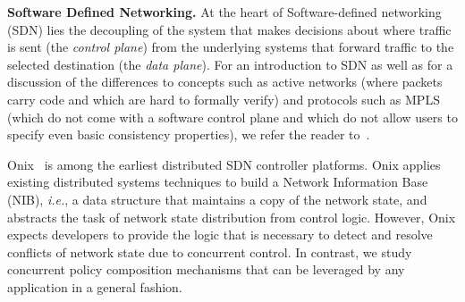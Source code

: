 \documentclass[11pt,pdftex,letter]{article}
\newcommand{\ie}{{\it i.e.}}
\newcommand{\etal}{{\it et al.}\xspace}
\newcommand{\ignore}[1]{}
\begin{document}
\ignore{
Our impossibility result in Section~\ref{sec:async} is inspired by the
$1$-resilient consensus impossibility proof~\cite{FLP85}. But our
notion of valency is defined with our two-layer nature of
concurrency in mind, which makes the reasoning quite different.
}


\noindent\textbf{Software Defined Networking.}
At the heart of Software-defined networking (SDN)
lies the decoupling of the system that makes decisions about where traffic is sent (the \emph{control plane})
from the underlying systems that forward traffic to the selected destination (the \emph{data plane}).
For an introduction to SDN as well as for a discussion of the differences to concepts such as active networks
(where packets carry code and which are hard to formally verify)
and protocols such as MPLS (which do not come with a software control plane and which do not allow
users to specify even basic consistency properties),
we refer the reader to~\cite{fabric}.

Onix~\cite{onix} is among the earliest distributed SDN controller platforms.
Onix applies existing distributed systems techniques to build a Network
Information Base (NIB), \ie, a data structure that maintains a copy of the
network state, and abstracts the task of network state distribution from
control logic. However, Onix expects developers to provide the logic that is
necessary to detect and resolve conflicts of network state due to concurrent
control. In contrast, we study concurrent policy composition mechanisms that
can be leveraged by any application in a general fashion.
\end{document}
